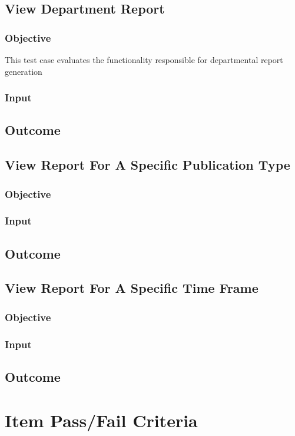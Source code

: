 \subsection{View Department Report}
\subsubsection{Objective}
This test case evaluates the functionality responsible for departmental report generation

\subsubsection{Input}
\subsection{Outcome}

\subsection{View Report For A Specific Publication Type}
\subsubsection{Objective}
\subsubsection{Input}
\subsection{Outcome}

\subsection{View Report For A Specific Time Frame}
\subsubsection{Objective}
\subsubsection{Input}
\subsection{Outcome}
\section{Item Pass/Fail Criteria}
  

